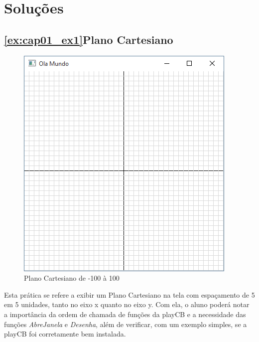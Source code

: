 \section{Soluções}

\subsection{\ref{ex:cap01_ex1}Plano Cartesiano}
\begin{figure}[ht]
  \centerline{\includegraphics[width=.5\textwidth]{img/cap1_ex1.png}}
  \caption{Plano Cartesiano de -100 à 100}
  \label{fig:cap01_ex1}
\end{figure}

Esta prática se refere a exibir um Plano Cartesiano na tela com espaçamento de 5 em 5 unidades, tanto no eixo x quanto no eixo y. Com ela, o aluno poderá notar a importância da ordem de chamada de funções da playCB e a necessidade das funções \emph{AbreJanela} e \emph{Desenha}, além de verificar, com um exemplo simples, se a playCB foi corretamente bem instalada.


